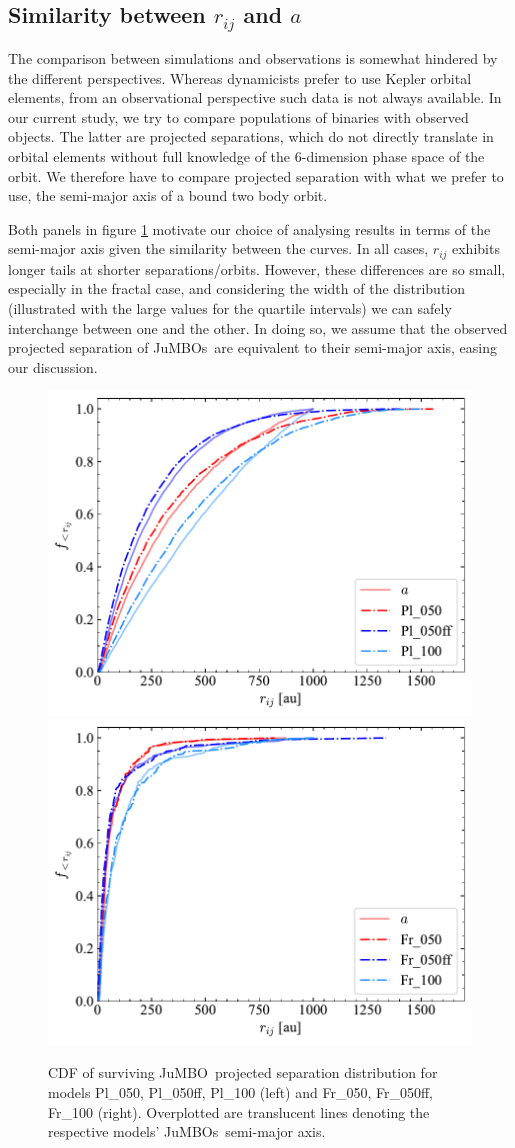 \documentclass[submission,phys]{lib/SciPost}
\newcommand{\jumbo}{\mbox{JuMBO}}
\newcommand{\jumbos}{\mbox{JuMBOs}}
\begin{document}
\begin{appendix}
  \section{Similarity between $r_{ij}$ and $a$}\label{Appendix:A}

  The comparison between simulations and observations is somewhat
  hindered by the different perspectives. Whereas dynamicists prefer
  to use Kepler orbital elements, from an observational perspective
  such data is not always available. In our current study, we try to
  compare populations of binaries with observed objects. The latter
  are projected separations, which do not directly translate in
  orbital elements without full knowledge of the 6-dimension phase
  space of the orbit. We therefore have to compare projected separation
  with what we prefer to use, the semi-major axis of a bound two body
  orbit.

  Both panels in figure \ref{Fig:Plummer_rsep} motivate
  our choice of analysing results in terms of the semi-major axis
  given the similarity between the curves.  In all cases, $r_{ij}$
  exhibits longer tails at shorter separations/orbits. However, these
  differences are so small, especially in the fractal case, and
  considering the width of the distribution (illustrated with the
  large values for the quartile intervals) we can safely interchange
  between one and the other. In doing so, we assume that the observed
  projected separation of \jumbos\, are equivalent to their semi-major
  axis, easing our discussion.
    
    \begin{figure}
    \centering
        \includegraphics[width=0.45\columnwidth]{figures/Plummer_General_proj_sep.pdf}
        \includegraphics[width=0.45\columnwidth]{figures/Fractal_General_proj_sep.pdf}
        \caption{CDF of surviving \jumbo\, projected separation distribution for models Pl\_050, Pl\_050ff, Pl\_100 (left) and Fr\_050, Fr\_050ff, Fr\_100 (right). Overplotted are translucent lines denoting the respective models' \jumbos\, semi-major axis.}
         \label{Fig:Plummer_rsep}
   \end{figure}
\end{appendix}
    
\end{document}
